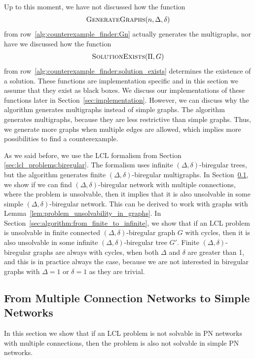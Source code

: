 Up to this moment, we have not discussed how the function \[ \textsc{GenerateGraphs}(n, \Delta, \delta) \] from row~\ref{alg:counterexample_finder:Gn} actually generates the multigraphs, nor have we discussed how the function \[ \textsc{SolutionExists}(\Pi, G) \] from row~\ref{alg:counterexample_finder:solution_exists} determines the existence of a solution.
These functions are implementation specific and in this section we assume that they exist as black boxes.
We discuss our implementations of these functions later in Section~\ref{sec:implementation}.
However, we can discuss why the algorithm generates multigraphs instead of simple graphs.
The algorithm generates multigraphs, because they are less restrictive than simple graphs.
Thus, we generate more graphs when multiple edges are allowed, which implies more possibilities to find a counterexample.

As we said before, we use the LCL formalism from Section \ref{sec:lcl_problems:biregular}.
The formalism uses infinite $(\Delta, \delta)$-biregular trees, but the algorithm generates finite $(\Delta, \delta)$-biregular multigraphs.
In Section~\ref{sec:algorithm:from_multiple_to_simple}, we show if we can find $(\Delta, \delta)$-biregular network with multiple connections, where the problem is unsolvable, then it implies that it is also unsolvable in some simple $(\Delta, \delta)$-biregular network.
This can be derived to work with graphs with Lemma~\ref{lem:problem_unsolvability_in_graphs}.
In Section~\ref{sec:algorithm:from_finite_to_infinite}, we show that if an LCL problem is unsolvable in finite connected $(\Delta, \delta)$-biregular graph $G$ with cycles, then it is also unsolvable in some infinite $(\Delta, \delta)$-biregular tree $G'$.
Finite $(\Delta, \delta)$-biregular graphs are always with cycles, when both $\Delta$ and $\delta$ are greater than 1, and this is in practice always the case, because we are not interested in biregular graphs with $\Delta=1$ or $\delta=1$ as they are trivial.


\subsection{From Multiple Connection Networks to Simple Networks} \label{sec:algorithm:from_multiple_to_simple}

In this section we show that if an LCL problem is not solvable in PN networks with multiple connections, then the problem is also not solvable in simple PN networks.

